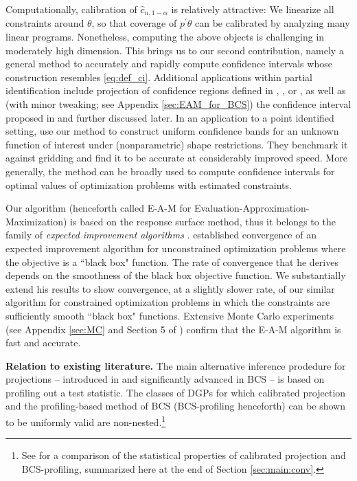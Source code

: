 \documentclass[letterpaper,11pt]{article}
\theoremstyle{myplain}
\theoremstyle{mydefinition}
\theoremstyle{myremark}
\renewcommand{\cite}{\citet}
\numberwithin{equation}{section}
\numberwithin{figure}{section}
\begin{document}
Computationally, calibration of $\hat{c}_{n,1-\alpha}$ is relatively attractive: We linearize all constraints around $\theta $, so that coverage of $p^\prime\theta$ can be calibrated by analyzing many linear programs. Nonetheless, computing the above objects is challenging in moderately high dimension.
This brings us to our second contribution, namely a general method to accurately and rapidly compute confidence intervals whose construction resembles \eqref{eq:def_ci}. Additional applications within partial identification include projection of confidence regions defined in \cite{CHT}, \cite{AS}, or \cite{AShiECMA}, as well as (with minor tweaking; see Appendix \ref{sec:EAM_for_BCS}) the confidence interval proposed in \cite[BCS henceforth]{BCS14_subv} and further discussed later. In an application to a point identified setting, \cite[Supplement Section S.3]{fre:rev17} use our method to construct uniform confidence bands for an unknown function of interest under (nonparametric) shape restrictions. They benchmark it against gridding and find it to be accurate at considerably improved speed. More generally, the method can be broadly used to compute confidence intervals for optimal values of optimization problems with estimated constraints.

Our algorithm (henceforth called E-A-M for Evaluation-Approximation-Maximization) is based on the response surface method, thus it belongs to the family of \emph{expected improvement algorithms} \citep[see e.g.][and references therein]{jonesa2001,jonesefficient1998}. \cite{Bull_Convergence_2011} established convergence of an expected improvement algorithm for unconstrained optimization problems where the objective is a ``black box" function. The rate of convergence that he derives depends on the smoothness of the black box objective function. We substantially extend his results to show convergence, at a slightly slower rate, of our similar algorithm for constrained optimization problems in which the constraints are sufficiently smooth ``black box" functions. Extensive Monte Carlo experiments (see Appendix \ref{sec:MC} and Section 5 of \cite{KMS_2017}) confirm that the E-A-M algorithm is fast and accurate.

\textbf{Relation to existing literature.}
The main alternative inference prodedure for projections -- introduced in \cite{Romano_Shaikh2008aJSPIWP} and significantly advanced in BCS -- is based on profiling out a test statistic. The classes of DGPs for which calibrated projection and the profiling-based method of BCS (BCS-profiling henceforth) can be shown to be uniformly valid are non-nested.\footnote{See \cite[Section 4.2 and Supplemental Appendix F]{KMS_2017} for a comparison of the statistical properties of calibrated projection and BCS-profiling, summarized here at the end of Section \ref{sec:main:conv}.}
\end{document}
